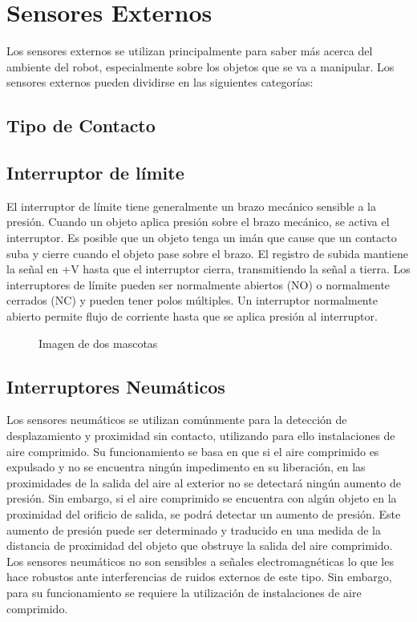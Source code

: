 \section{Sensores Externos}
Los sensores externos se utilizan principalmente para saber más acerca del ambiente del robot, especialmente sobre los objetos que se va a manipular. Los sensores externos pueden
dividirse en las siguientes categorías:

\subsection{Tipo de Contacto}

\subsection*{\quad\textbf{Interruptor de límite}}
El interruptor de límite tiene generalmente un brazo mecánico sensible a la presión. Cuando un objeto aplica presión sobre el brazo mecánico, se activa el interruptor. Es posible que un objeto tenga un imán que cause que un contacto suba y cierre cuando el objeto pase sobre el brazo. El registro de subida mantiene la señal en +V hasta que el interruptor cierra, transmitiendo la señal a tierra.\linebreak
Los interruptores de límite pueden ser normalmente abiertos (NO) o normalmente cerrados (NC) y pueden tener polos múltiples. Un interruptor normalmente abierto permite flujo de corriente hasta que se aplica presión al interruptor. 

\begin{figure}[h]
	\centering
	\qquad
	\caption{Imagen de dos mascotas}
	\label{fig:Tacómetro}
\end{figure}

\subsection*{\quad\textbf{Interruptores Neumáticos}}
Los sensores neumáticos se utilizan comúnmente para la detección de desplazamiento y proximidad sin contacto, utilizando para ello instalaciones de aire comprimido. Su funcionamiento se basa en que si el aire comprimido es expulsado y no se encuentra ningún impedimento en su liberación, en las proximidades de la salida del aire al exterior no se detectará ningún aumento de presión. Sin embargo, si el aire comprimido se encuentra con algún objeto en la proximidad del orificio de salida, se podrá detectar un aumento de presión. Este aumento de presión puede ser determinado y traducido en una medida de la distancia de proximidad del objeto que obstruye la salida del aire comprimido. Los sensores neumáticos no son sensibles a señales electromagnéticas lo que les hace robustos ante interferencias de ruidos externos de este tipo. Sin embargo, para su
funcionamiento se requiere la utilización de instalaciones de aire comprimido.

